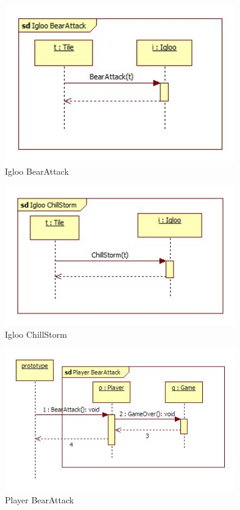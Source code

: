 \begin{figure}[H]
        \begin{center}
                \includegraphics[width=10cm]{chapters/chapter07/seqdiag/Igloo_BearAttack.jpg}
                \caption{Igloo BearAttack}
                \label{Igloo BearAttack}
        \end{center}
\end{figure}
\begin{figure}[H]
        \begin{center}
                \includegraphics[width=10cm]{chapters/chapter07/seqdiag/Igloo_ChillStorm.jpg}
                \caption{Igloo ChillStorm}
                \label{Igloo ChillStorm}
        \end{center}
\end{figure}
\begin{figure}[H]
        \begin{center}
                \includegraphics[width=10cm]{chapters/chapter07/seqdiag/Player_BearAttack.jpg}
                \caption{Player BearAttack}
                \label{Player BearAttack}
        \end{center}
\end{figure}
